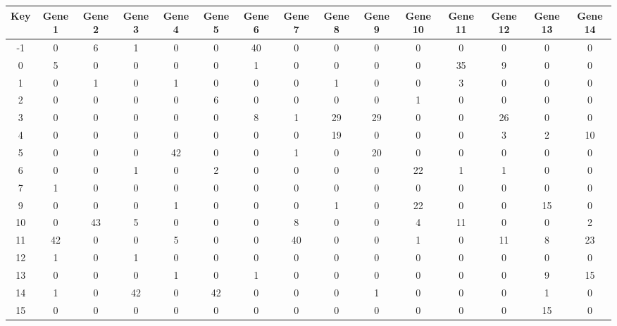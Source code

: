 \begin{tabular}{|c|c|c|c|c|c|c|c|c|c|c|c|c|c|c|}
\hline
Key & Gene 1 & Gene 2 & Gene 3 & Gene 4 & Gene 5 & Gene 6 & Gene 7 & Gene 8 & Gene 9 & Gene 10 & Gene 11 & Gene 12 & Gene 13 & Gene 14 \\
\hline
-1 & 0 & 6 & 1 & 0 & 0 & 40 & 0 & 0 & 0 & 0 & 0 & 0 & 0 & 0 \\
0 & 5 & 0 & 0 & 0 & 0 & 1 & 0 & 0 & 0 & 0 & 35 & 9 & 0 & 0 \\
1 & 0 & 1 & 0 & 1 & 0 & 0 & 0 & 1 & 0 & 0 & 3 & 0 & 0 & 0 \\
2 & 0 & 0 & 0 & 0 & 6 & 0 & 0 & 0 & 0 & 1 & 0 & 0 & 0 & 0 \\
3 & 0 & 0 & 0 & 0 & 0 & 8 & 1 & 29 & 29 & 0 & 0 & 26 & 0 & 0 \\
4 & 0 & 0 & 0 & 0 & 0 & 0 & 0 & 19 & 0 & 0 & 0 & 3 & 2 & 10 \\
5 & 0 & 0 & 0 & 42 & 0 & 0 & 1 & 0 & 20 & 0 & 0 & 0 & 0 & 0 \\
6 & 0 & 0 & 1 & 0 & 2 & 0 & 0 & 0 & 0 & 22 & 1 & 1 & 0 & 0 \\
7 & 1 & 0 & 0 & 0 & 0 & 0 & 0 & 0 & 0 & 0 & 0 & 0 & 0 & 0 \\
9 & 0 & 0 & 0 & 1 & 0 & 0 & 0 & 1 & 0 & 22 & 0 & 0 & 15 & 0 \\
10 & 0 & 43 & 5 & 0 & 0 & 0 & 8 & 0 & 0 & 4 & 11 & 0 & 0 & 2 \\
11 & 42 & 0 & 0 & 5 & 0 & 0 & 40 & 0 & 0 & 1 & 0 & 11 & 8 & 23 \\
12 & 1 & 0 & 1 & 0 & 0 & 0 & 0 & 0 & 0 & 0 & 0 & 0 & 0 & 0 \\
13 & 0 & 0 & 0 & 1 & 0 & 1 & 0 & 0 & 0 & 0 & 0 & 0 & 9 & 15 \\
14 & 1 & 0 & 42 & 0 & 42 & 0 & 0 & 0 & 1 & 0 & 0 & 0 & 1 & 0 \\
15 & 0 & 0 & 0 & 0 & 0 & 0 & 0 & 0 & 0 & 0 & 0 & 0 & 15 & 0 \\
\hline
\end{tabular}